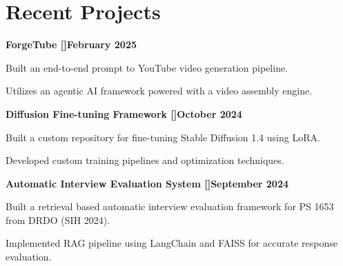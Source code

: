 \documentclass[letterpaper,10pt]{article}
\newcommand{\heading}[2]{
  \hspace{10pt}#1\hfill#2\\
}
\newcommand{\headingBf}[2]{
  \heading{\textbf{#1}}{\textbf{#2}}
}
\newenvironment{resume_list}{
  \vspace{-7pt}
  \begin{itemize}[itemsep=-2px, parsep=1pt, leftmargin=30pt]
}{
  \end{itemize}
  \vspace{-2pt}
}
\begin{document}

  \section{Recent Projects}

  \headingBf{ForgeTube [\href{https://github.com/MLSAKIIT/ForgeTube}{\faGithub}]}{February 2025}
 \begin{resume_list}
   \item Built an end-to-end prompt to YouTube video generation pipeline. 
   \item Utilizes an agentic AI framework powered with a video assembly engine. 
 \end{resume_list}
 
 \headingBf{Diffusion Fine-tuning Framework [\href{https://github.com/MLSAKIIT/stablediffusionlora}{\faGithub}]}{October 2024}
 \begin{resume_list}
   \item Built a custom repository for fine-tuning Stable Diffusion 1.4 using LoRA.
   \item Developed custom training pipelines and optimization techniques.
 \end{resume_list}

 \headingBf{Automatic Interview Evaluation System [\href{https://github.com/sohambuilds/interview_eval}{\faGithub}]}{September 2024}
 \begin{resume_list}
   \item Built a retrieval based automatic interview evaluation framework for PS 1653 from DRDO (SIH 2024).
   \item Implemented RAG pipeline using LangChain and FAISS for accurate response evaluation.
 \end{resume_list}

\end{document}
